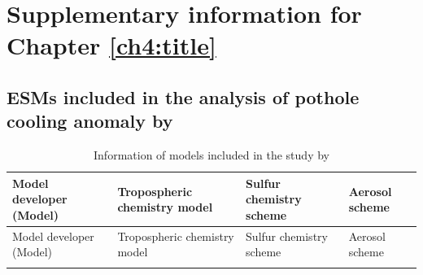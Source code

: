 \chapter{Supplementary information for Chapter \ref{ch4:title}} 

\section{ESMs included in the analysis of pothole cooling anomaly by \citet{zhangRoleAnthropogenicAerosols2021}}

\begin{small}
\begin{longtable}{>{\raggedright}p{3.25cm} >{\raggedright}p{3.25cm} >{\raggedright}p{3.5cm} >{\raggedright\arraybackslash}p{3.5cm}}
    \caption[Information of models included in the study by \citet{zhangRoleAnthropogenicAerosols2021}]{Information of models included in the study by \citet{zhangRoleAnthropogenicAerosols2021}}
    \label{tab:zhang-model}
    \\
    \toprule
     Model developer (Model) & Tropospheric chemistry model & Sulfur chemistry scheme & Aerosol scheme \\
     \midrule
     \endfirsthead

    \toprule
     Model developer (Model) & Tropospheric chemistry model & Sulfur chemistry scheme & Aerosol scheme \\
     \midrule
     \endhead
     
     \bottomrule
     \endlastfoot


\end{longtable}
\end{small}
